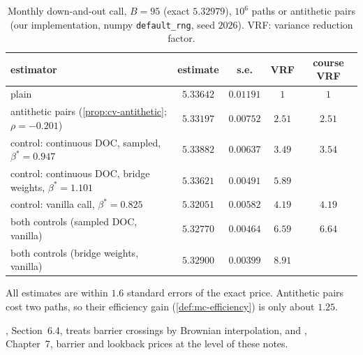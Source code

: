 \begin{table}[ht]
\centering
\small
\caption{Monthly down-and-out call, $B=95$ (exact $5.32979$), $10^6$ paths or antithetic pairs (our
  implementation, numpy \texttt{default\_rng}, seed $2026$). VRF: variance reduction factor.}
\label{tab:bar-mc}
\begin{tabular}{@{}lcccc@{}}
\toprule
estimator & estimate & s.e. & VRF & course VRF\\
\midrule
plain & $5.33642$ & $0.01191$ & $1$ & $1$\\
antithetic pairs (\cref{prop:cv-antithetic}; $\rho=-0.201$) & $5.33197$ & $0.00752$ & $2.51$ & $2.51$\\
control: continuous DOC, sampled, $\beta^*=0.947$ & $5.33882$ & $0.00637$ & $3.49$ & $3.54$\\
control: continuous DOC, bridge weights, $\beta^*=1.101$ & $5.33621$ & $0.00491$ & $5.89$ & \\
control: vanilla call, $\beta^*=0.825$ & $5.32051$ & $0.00582$ & $4.19$ & $4.19$\\
both controls (sampled DOC, vanilla) & $5.32770$ & $0.00464$ & $6.59$ & $6.64$\\
both controls (bridge weights, vanilla) & $5.32900$ & $0.00399$ & $8.91$ & \\
\bottomrule
\end{tabular}
\end{table}

All estimates are within $1.6$ standard errors of the exact price. Antithetic pairs cost two
paths, so their efficiency gain (\cref{def:mc-efficiency}) is only about $1.25$.


\furtherreading
\textcite{glasserman-mc}, Section~6.4, treats barrier crossings by Brownian interpolation, and
\textcite{shreve2}, Chapter~7, barrier and lookback prices at the level of these notes.
